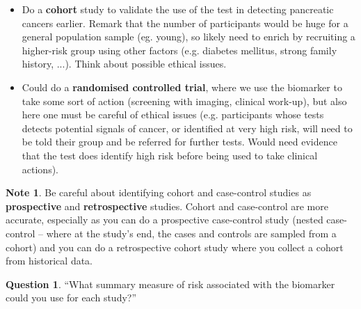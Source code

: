 \documentclass[a4paper,11pt]{scrartcl}
\theoremstyle{plain}
\theoremstyle{remark}
\theoremstyle{definition}
\newtheorem{note}[thm]{Note}
\newtheorem{quest}[thm]{Question}
\begin{document}
\begin{itshape}
\begin{itemize}
\begin{itemize}
	\end{itemize}
\item Do a \textbf{cohort} study to validate the use of the test in detecting pancreatic cancers earlier. Remark that the number of participants would be huge for a general population sample (eg. young), so likely need to enrich by recruiting a higher-risk group using other factors (e.g. diabetes mellitus, strong family history, ...). Think about possible ethical issues.
\item Could do a \textbf{randomised controlled trial}, where we use the biomarker to take some sort of action (screening with imaging, clinical work-up), but also here one must be careful of ethical issues (e.g. participants whose tests detects potential signals of cancer, or identified at very high risk, will need to be told their group and be referred for further tests. Would need evidence that the test does identify high risk before being used to take clinical actions).
\end{itemize}
\end{itshape}

\begin{note}
Be careful about identifying cohort and case-control studies as \textbf{prospective} and \textbf{retrospective} studies. Cohort and case-control are more accurate, especially as you can do a prospective case-control study (nested case-control – where at the study's end, the cases and controls are sampled from a cohort) and you can do a retrospective cohort study where you collect a cohort from historical data.
\end{note}


\begin{quest} ``What summary measure of risk associated with the biomarker could you use for each study?''
\end{quest}
\end{document}
